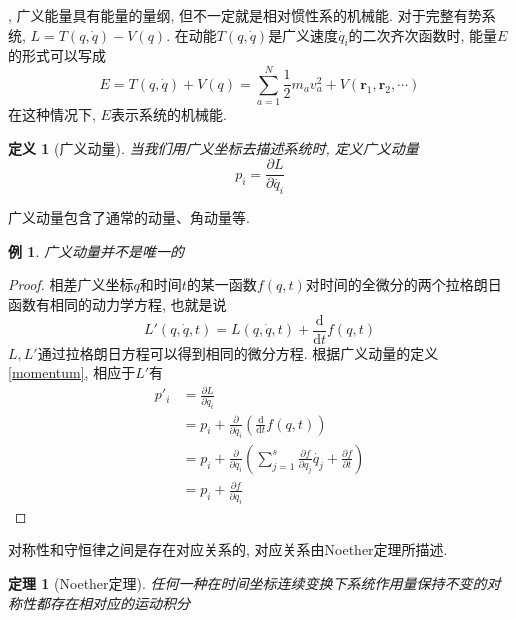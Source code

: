 \documentclass[a4paper,11pt]{article}
\newtheorem{definition}{\hspace{2em}定义}[section]
\newtheorem{theorem}{\hspace{2em}定理}[section]
\newtheorem{proof}{证明}[section]
\newtheorem{example}{例}[section]
\begin{document}
, 广义能量具有能量的量纲, 但不一定就是相对惯性系的机械能. 对于完整有势系统, $L=T(q,\dot{q})-V(q)$. 在动能$T(q,\dot{q})$是广义速度$\dot{q_i}$的二次齐次函数时, 能量$E$的形式可以写成
\begin{equation*}
  E=T(q,\dot{q})+V(q)=\sum_{a=1}^{N}\frac{1}{2}m_av_a^2+V(\mathbf{r}_1,\mathbf{r}_2,\cdots)
\end{equation*}
在这种情况下, $E$表示系统的机械能.

\begin{definition}[广义动量]
  当我们用广义坐标去描述系统时, 定义广义动量
  \begin{equation}\label{momentum}
    p_i=\frac{\partial L}{\partial{\dot{q_i}}}
  \end{equation}
\end{definition}
广义动量包含了通常的动量、角动量等.
\begin{example}
  广义动量并不是唯一的
\end{example}
\begin{proof}
  相差广义坐标$q$和时间$t$的某一函数$f(q,t)$对时间的全微分的两个拉格朗日函数有相同的动力学方程, 也就是说
  \begin{equation*}
    L'(q,\dot{q},t)=L(q,\dot{q},t)+\frac{\mathrm{d}}{\mathrm{d}t}f(q,t)
  \end{equation*}
  $L,L'$通过拉格朗日方程可以得到相同的微分方程. 根据广义动量的定义\eqref{momentum}, 相应于$L'$有
  \begin{equation*}
    \begin{split}
       p'_i & =\frac{\partial L}{\partial{\dot{q_i}}} \\
         & =p_i+\frac{\partial}{\partial\dot{q_i}}\left(\frac{\mathrm{d}}{\mathrm{d}t}f(q,t)\right) \\
         & =p_i+\frac{\partial}{\partial{\dot{q_i}}}\left(\sum_{j=1}^{s}\frac{\partial f}{\partial{q_j}}\dot{q_j}+\frac{\partial f}{\partial t}\right) \\
         & =p_i+\frac{\partial{f}}{\partial{q_i}}
    \end{split}
  \end{equation*}
\end{proof}
对称性和守恒律之间是存在对应关系的, 对应关系由Noether定理所描述.
\begin{theorem}[Noether定理]
  任何一种在时间坐标连续变换下系统作用量保持不变的对称性都存在相对应的运动积分
\end{theorem}
\end{document}

